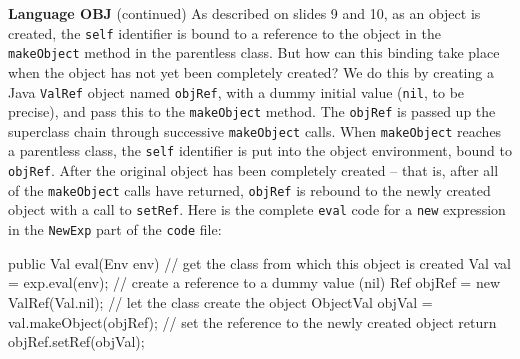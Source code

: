 \begin{minipage}[t]{\sw}
\slidenumber
\LARGE
{\bf Language OBJ} (continued)\exx
As described on slides 9 and 10,
as an object is created,
the \verb'self' identifier is bound
to a reference to the object
in the \verb'makeObject' method in the parentless class.
But how can this binding take place
when the object has not yet been completely created?
We do this by creating a Java \verb'ValRef' object named \verb'objRef',
with a dummy initial value (\verb'nil', to be precise),
and pass this to the \verb'makeObject' method.\exx
The \verb'objRef' is passed up the superclass chain
through successive \verb'makeObject' calls.
When \verb'makeObject' reaches a parentless class,
the \verb'self' identifier is put into the object environment,
bound to \verb'objRef'.
After the original object has been completely created --
that is, after all of the \verb'makeObject' calls have returned,
\verb'objRef' is rebound to the newly created object
with a call to \verb'setRef'.
Here is the complete \verb'eval' code for a \verb'new' expression
in the \verb'NewExp' part of the \verb'code' file: 
\Large
\begin{qv}
    public Val eval(Env env) {
        // get the class from which this object is created
        Val val = exp.eval(env);
        // create a reference to a dummy value (nil)
        Ref objRef = new ValRef(Val.nil);
        // let the class create the object
        ObjectVal objVal = val.makeObject(objRef);
        // set the reference to the newly created object
        return objRef.setRef(objVal);
    }
\end{qv}
\end{minipage}
